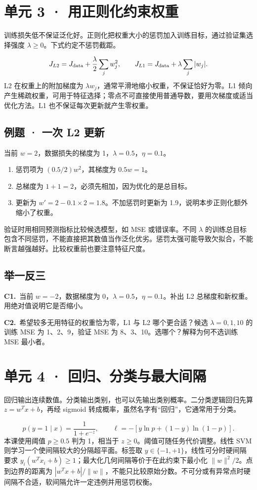 \documentclass[UTF8,a4paper,11pt]{ctexart}
\newcommand{\CompactQuestion}[2]{\par\noindent\textbf{#1.}\ #2\par\vspace{.8em}}
\begin{document}
\section{单元 3 · 用正则化约束权重}
训练损失低不保证泛化好。正则化把权重大小的惩罚加入训练目标，通过验证集选择强度 $\lambda\geq0$。下式约定不惩罚截距。

\[J_{L2}=J_{\rm data}+\frac{\lambda}{2}\sum_j w_j^2,\qquad J_{L1}=J_{\rm data}+\lambda\sum_j|w_j|.\]
L2 在权重上的附加梯度为 $\lambda w_j$，通常平滑地缩小权重，不保证恰好为零。L1 倾向产生稀疏权重，可用于特征选择；零点不可直接使用普通导数，要用次梯度或适当优化方法。L1 也不保证每次更新就产生零权重。

\subsection{例题 · 一次 L2 更新}
当前 $w=2$，数据损失的梯度为 1，$\lambda=0.5$，$\eta=0.1$。

\begin{enumerate}
\item 惩罚项为 $(0.5/2)w^2$，其梯度为 $0.5w=1$。
\item 总梯度为 $1+1=2$，必须先相加，因为优化的是总目标。
\item 更新为 $w'=2-0.1\times2=1.8$。不加惩罚时更新为 1.9，说明本步正则化额外缩小了权重。
\end{enumerate}
验证时用相同预测指标比较候选模型，如 MSE 或错误率。不同 $\lambda$ 的训练总目标包含不同惩罚，不能直接把其数值当作泛化优劣。惩罚太强可能导致欠拟合，不能断言越强越好。比较权重前也要注意特征尺度。

\subsection{举一反三}
\CompactQuestion{C1}{当前 $w=-2$，数据梯度为 0，$\lambda=0.5$，$\eta=0.1$。补出 L2 总梯度和新权重。用绝对值说明它是否缩小。}
\CompactQuestion{C2}{希望较多无用特征的权重恰为零，L1 与 L2 哪个更合适？候选 $\lambda=0,1,10$ 的训练 MSE 为 1、2、9，验证 MSE 为 8、3、10。选哪个？解释为何不选训练 MSE 最小者。}
\clearpage
\section{单元 4 · 回归、分类与最大间隔}
回归输出连续数值。分类输出类别，也可以先输出类别概率。二分类逻辑回归先算 $z=w^Tx+b$，再经 sigmoid 转成概率，虽然名字有“回归”，它通常用于分类。

\[p(y=1\mid x)=\frac{1}{1+e^{-z}},\qquad \ell=-[y\ln p+(1-y)\ln(1-p)].\]
本课使用阈值 $p\geq0.5$ 判为 1，相当于 $z\geq0$。阈值可随任务代价调整。线性 SVM 则学习一个使间隔较大的分隔超平面。标签取 $y\in\{-1,+1\}$，线性可分时硬间隔要求 $y_i(w^Tx_i+b)\geq1$；最大化几何间隔等价于在此约束下最小化 $\|w\|^2/2$。点到边界的距离为 $|w^Tx+b|/\|w\|$，不能只比较原始分数。不可分或有异常点时硬间隔不合适，软间隔允许一定违例并用惩罚权衡。
\end{document}
